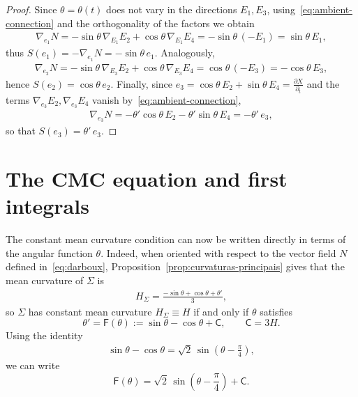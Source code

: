 \documentclass[11pt,a4paper]{amsart}
\newcommand{\n}{\nabla}
\renewcommand{\S}{\Sigma}
\theoremstyle{plain}
\theoremstyle{remark}
\newcommand{\C}{\mathsf{C}}
\newcommand{\F}{\mathsf{F}}
\begin{document}
\begin{proof}
Since $\theta=\theta(t)$ does not vary in the directions $E_1,E_3$, using~\eqref{eq:ambient-connection} and the orthogonality of the factors we obtain
\begin{align*}
\n_{e_1}N=-\sin\theta\,\n_{E_1}E_2+\cos\theta\,\n_{E_1}E_4
=-\sin\theta\,(-E_1)=\sin\theta\,E_1,
\end{align*}
thus $S(e_1)=-\n_{e_1}N=-\sin\theta\,e_1$. Analogously,
\begin{align*}
\n_{e_2}N=-\sin\theta\,\n_{E_3}E_2+\cos\theta\,\n_{E_3}E_4
=\cos\theta\,(-E_3)=-\cos\theta\,E_3,
\end{align*}
hence $S(e_2)=\cos\theta\,e_2$. Finally, since $e_3=\cos\theta\,E_2+\sin\theta\,E_4 = \frac{\partial X}{\partial_t}$ and the terms $\n_{e_3}E_2,\n_{e_3}E_4$ vanish by~\eqref{eq:ambient-connection},
\begin{align*}
\n_{e_3}N=-\theta'\cos\theta\,E_2-\theta'\sin\theta\,E_4=-\theta'\,e_3,
\end{align*}
so that $S(e_3)=\theta'\,e_3$.
\end{proof}

\section{The CMC equation and first integrals}
\label{sec:integrabilidade}

The constant mean curvature condition can now be written directly
in terms of the angular function $\theta$. Indeed, when oriented with respect to the vector field
$N$ defined in~\eqref{eq:darboux}, Proposition~\ref{prop:curvaturas-principais} gives that
the mean curvature of $\S$ is
\begin{align*}
H_\S=\frac{-\sin\theta+\cos\theta+\theta'}{3},
\end{align*}
so $\S$ has constant mean curvature $H_\S\equiv H$ if and only if $\theta$ satisfies
\begin{equation}\label{eq:edo-cmc}
\boxed{\;
\theta'=\F(\theta):=\sin\theta-\cos\theta+\C,
\qquad
\C=3H.
\;}
\end{equation}
Using the identity
\begin{align*}
\sin\theta-\cos\theta
=
\sqrt2\,\sin\!\left(\theta-\frac\pi4\right),
\end{align*}
we can write
\begin{equation}\label{eq:F-def}
\F(\theta)
=
\sqrt2\,\sin\!\left(\theta-\frac\pi4\right)+\C.
\end{equation}
\end{document}

